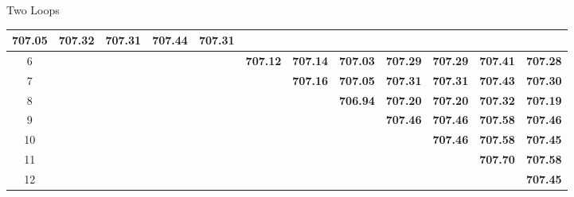 \documentclass[hyphens,aspectratio=169]{beamer}
\begin{document}
\begin{frame}[fragile]{Two Loops}
\begin{table}[H]
\begin{adjustbox}{max width=\textwidth,max height=2\textheight}
\begin{tabular}{|c|c|c|c|c|c|c|c|c|c|c|c|}
				\textbf{707.05} & \textbf{707.32} & \textbf{707.31} &
				\textbf{707.44} & \textbf{707.31}                                                                                                                                                                                     \\
				\hline
				6               &                 &                 &                 &                 & \textbf{707.12} & \textbf{707.14} & \textbf{707.03}
				                & \textbf{707.29} & \textbf{707.29} & \textbf{707.41} & \textbf{707.28}                                                                                                                               \\
				\hline
				7               &                 &                 &                 &                 &                 & \textbf{707.16} & \textbf{707.05} &
				\textbf{707.31} & \textbf{707.31} & \textbf{707.43} & \textbf{707.30}                                                                                                                                                 \\
				\hline
				8               &                 &                 &                 &                 &                 &                 & \textbf{706.94} & \textbf{707.20} &
				\textbf{707.20} & \textbf{707.32} & \textbf{707.19}                                                                                                                                                                   \\
				\hline
				9               &                 &                 &                 &                 &                 &                 &                 & \textbf{707.46} & \textbf{707.46} &
				\textbf{707.58} & \textbf{707.46}                                                                                                                                                                                     \\
				\hline
				10              &                 &                 &                 &                 &                 &                 &                 &                 & \textbf{707.46} & \textbf{707.58} &
				\textbf{707.45}                                                                                                                                                                                                       \\
				\hline
				11              &                 &                 &                 &                 &                 &                 &                 &                 &                 & \textbf{707.70} & \textbf{707.58} \\
				\hline
				12              &                 &                 &                 &                 &                 &                 &                 &                 &                 &                 & \textbf{707.45} \\
				\hline
			\end{tabular}


\end{adjustbox}
\end{table}
\end{frame}
\end{document}
